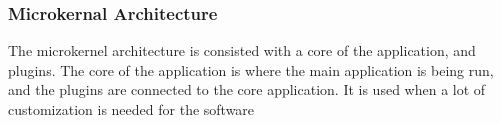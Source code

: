 \subsubsection[Microkernal Architecture]{Microkernal Architecture}
The microkernel architecture is consisted with a core of the application, and plugins. 
The core of the application is where the main application is being run, and the plugins are connected to the core application. 
It is used when a lot of customization is needed for the software